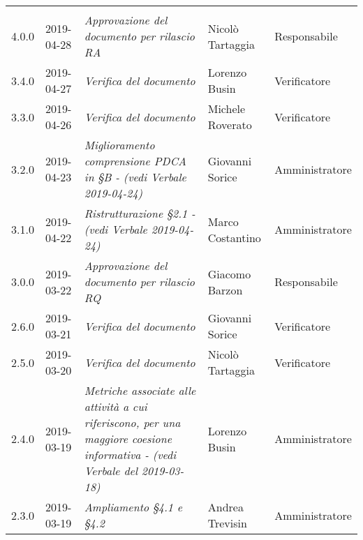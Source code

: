 \newpage 
\section*{}
	\begin{longtable}{C{2cm}|C{2.5cm}|C{4.5cm}|C{2.5cm}|C{3cm}}

		 &  &  &  &   \\
		\endhead
		
		4.0.0 & 2019-04-28 & \emph{Approvazione del documento per rilascio RA} & Nicolò Tartaggia & Responsabile \\
		\hline
		
		3.4.0 & 2019-04-27 & \emph{Verifica del documento} & Lorenzo Busin & Verificatore \\
		\hline
		
		3.3.0 & 2019-04-26 & \emph{Verifica del documento} & Michele Roverato & Verificatore \\
		\hline
		
		3.2.0 & 2019-04-23 & \emph{Miglioramento comprensione PDCA in §B - (vedi Verbale 2019-04-24)} & Giovanni Sorice & Amministratore \\
		\hline
		
		3.1.0 & 2019-04-22 & \emph{Ristrutturazione §2.1 -(vedi Verbale 2019-04-24)} & Marco Costantino & Amministratore \\
		\hline
		
		3.0.0 & 2019-03-22 & \emph{Approvazione del documento per rilascio RQ} & Giacomo Barzon & Responsabile \\
		\hline
		
		2.6.0 & 2019-03-21 & \emph{Verifica del documento}  & Giovanni Sorice & Verificatore  \\
		\hline
		
		2.5.0 & 2019-03-20 & \emph{Verifica del documento} & Nicolò Tartaggia & Verificatore  \\
		\hline
		
		2.4.0 & 2019-03-19 & \emph{Metriche associate alle attività a cui riferiscono, per una maggiore coesione informativa - (vedi Verbale del 2019-03-18)} & Lorenzo Busin & Amministratore \\
		\hline
		
		2.3.0 & 2019-03-19 & \emph{Ampliamento §4.1 e §4.2} & Andrea Trevisin & Amministratore \\
		\hline
		

\end{longtable}

